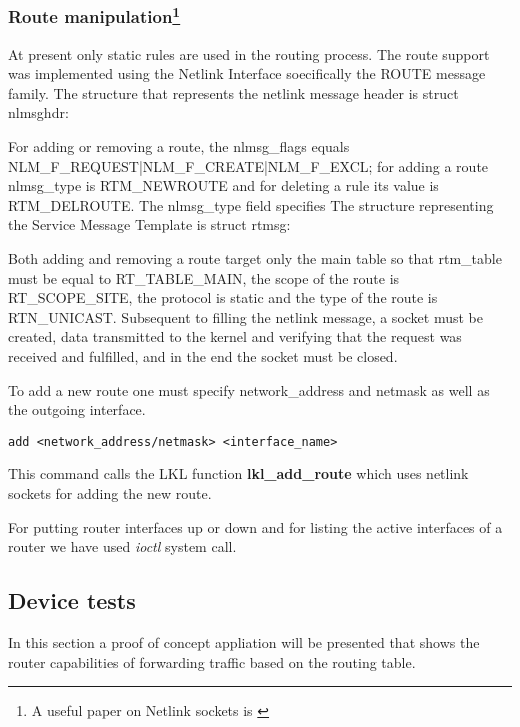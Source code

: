 {{\subsubsection[Route manipulation]{Route manipulation\footnote{A useful paper on Netlink sockets is \cite{netlinksockets}}}
At present only static rules are used in the routing process.
The route support was implemented using the Netlink Interface soecifically the ROUTE message family.
The structure that represents the netlink message header is struct nlmsghdr:
\lstset{language=C, caption=Netlink Message Header Structure}

For adding or removing a route, the nlmsg_flags equals NLM_F_REQUEST|NLM_F_CREATE|NLM_F_EXCL; for adding a route nlmsg_type is RTM_NEWROUTE and for deleting a rule its value is RTM_DELROUTE.
The nlmsg_type field specifies 
The structure representing the Service Message Template is struct rtmsg:
\lstset{language=C, caption=Service Message Template Structure}

Both adding and removing a route target only the main table so that rtm_table must be equal to RT_TABLE_MAIN, the scope of the route is RT_SCOPE_SITE, the protocol is static and the type of the route is RTN_UNICAST.
Subsequent to filling the netlink message, a socket must be created, data transmitted to the kernel and verifying that the request was received and fulfilled, and in the end the socket must be closed.
\lstset{language=C, caption=Communicating with the kernel}
  

To add a new route one must specify network_address and netmask as well as the outgoing interface.
\lstset{language=zsh,caption=Adding a new interface,label=lst:saddrule}
\begin{lstlisting}
add <network_address/netmask> <interface_name> 
\end{lstlisting}  
This command calls the LKL function {\bf lkl_add_route} which uses netlink sockets for adding the new route.

For putting router interfaces up or down and for listing the active interfaces of a router we have used \textit{ioctl} system call.

\subsection{Device tests}
\label{sub-sec:router-tests}

In this section a proof of concept appliation will be presented that shows the router capabilities of forwarding traffic based on the routing table. 

}}
